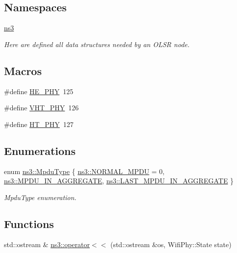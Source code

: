 \subsection*{Namespaces}
\begin{DoxyCompactItemize}
\item 
 \hyperlink{namespacens3}{ns3}
\begin{DoxyCompactList}\small\item\em Here are defined all data structures needed by an O\+L\+SR node. \end{DoxyCompactList}\end{DoxyCompactItemize}
\subsection*{Macros}
\begin{DoxyCompactItemize}
\item 
\#define \hyperlink{wifi-phy_8h_a4d8ba0c6033ee667a5145799b36facec}{H\+E\+\_\+\+P\+HY}~125
\item 
\#define \hyperlink{wifi-phy_8h_aa9033bc77b3ccafb06e343442bf31e13}{V\+H\+T\+\_\+\+P\+HY}~126
\item 
\#define \hyperlink{wifi-phy_8h_aa14582218f55eb2528494e9d2da6da5e}{H\+T\+\_\+\+P\+HY}~127
\end{DoxyCompactItemize}
\subsection*{Enumerations}
\begin{DoxyCompactItemize}
\item 
enum \hyperlink{namespacens3_ae617d41bbd0c07fa58ee2306f687b055}{ns3\+::\+Mpdu\+Type} \{ \hyperlink{namespacens3_ae617d41bbd0c07fa58ee2306f687b055a1fa7c2077d3b19b000b35004914f50eb}{ns3\+::\+N\+O\+R\+M\+A\+L\+\_\+\+M\+P\+DU} = 0, 
\hyperlink{namespacens3_ae617d41bbd0c07fa58ee2306f687b055ac78adeb4fa20b2eefca65601b0b38625}{ns3\+::\+M\+P\+D\+U\+\_\+\+I\+N\+\_\+\+A\+G\+G\+R\+E\+G\+A\+TE}, 
\hyperlink{namespacens3_ae617d41bbd0c07fa58ee2306f687b055a00f5645550d1d4766ba10c4ac229b276}{ns3\+::\+L\+A\+S\+T\+\_\+\+M\+P\+D\+U\+\_\+\+I\+N\+\_\+\+A\+G\+G\+R\+E\+G\+A\+TE}
 \}\begin{DoxyCompactList}\small\item\em Mpdu\+Type enumeration. \end{DoxyCompactList}
\end{DoxyCompactItemize}
\subsection*{Functions}
\begin{DoxyCompactItemize}
\item 
std\+::ostream \& \hyperlink{namespacens3_ae18ddf3b1710eb0457373ad6b369c19e}{ns3\+::operator$<$$<$} (std\+::ostream \&os, Wifi\+Phy\+::\+State state)
\end{DoxyCompactItemize}


